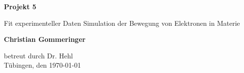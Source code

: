 \documentclass[12pt]{article}
\begin{document}
\newcommand{\half}{\frac{1}{2}}
\begin{titlepage}
    \begin{center}
        \vspace*{1cm}
            
        \Huge
        \textbf{Projekt 5}
            
        
        \large
        
            
        \vspace{0.7cm}
            \hspace*{2.5cm}Fit experimenteller Daten\newline
            Simulation der Bewegung von Elektronen in Materie
        \vspace{2cm}
        

        \textbf{Christian Gommeringer}
            
        \vspace*{7cm}
        
        
            
        
              
        
            
        
            
        \normalsize
        betreut durch Dr. Hehl\\
        \vspace*{1cm}
        Tübingen, den \today
        
            
    \end{center}
\end{titlepage}
\end{document}
